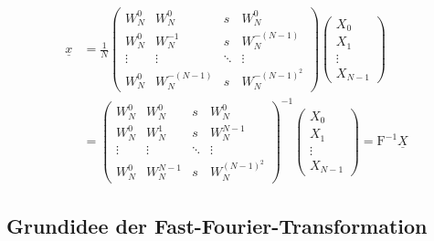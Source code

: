 \begin{align}
{\underline{x}} &=  {\frac{1}{N}  \left(\begin{array}{cccc} {W_{N}^{0} } & {W_{N}^{0} } & {s } & {W_{N}^{0} } \\
{W_{N}^{0} } & {W_{N}^{-1} } & {s } & {W_{N}^{-\left(N-1\right)} } \\
{\vdots } & {\vdots } & {\ddots } & {\vdots } \\
{W_{N}^{0} } & {W_{N}^{-\left(N-1\right)} } & {s } & {W_{N}^{-\left(N-1\right)^{2} } } \end{array}\right) \left(\begin{array}{c} {X_{0} } \\
{X_{1} } \\
{\vdots } \\
{X_{N-1} } \end{array}\right)} \\
{} &=  {\left(\begin{array}{cccc} {W_{N}^{0} } & {W_{N}^{0} } & {s } & {W_{N}^{0} } \\
{W_{N}^{0} } & {W_{N}^{1} } & {s } & {W_{N}^{N-1} } \\
{\vdots } & {\vdots } & {\ddots } & {\vdots } \\
{W_{N}^{0} } & {W_{N}^{N-1} } & {s } & {W_{N}^{\left(N-1\right)^{2} } } \end{array}\right)^{-1}  \left(\begin{array}{c} {X_{0} } \\
{X_{1} } \\
{\vdots } \\
{X_{N-1} } \end{array}\right)=\boldsymbol{\mathrm{F}}^{-1}  \underline{X}}
\label{eq:10.88}
\end{align}
\subsection{Grundidee der Fast-Fourier-Transformation}\label{sec:grundidee-der-fast-fourier-transformation}

